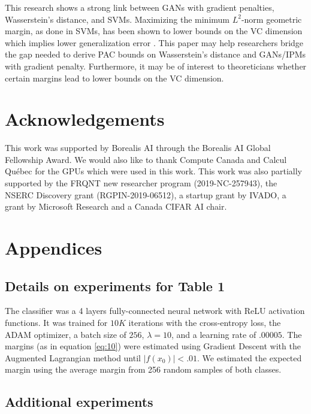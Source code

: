 \documentclass{article}
\begin{document}
This research shows a strong link between GANs with gradient penalties, Wasserstein's distance, and SVMs. Maximizing the minimum $L^2$-norm geometric margin, as done in SVMs, has been shown to lower bounds on the VC dimension which implies lower generalization error \citep{vapnik1998statistical,mount2015sure}. This paper may help researchers bridge the gap needed to derive PAC bounds on Wasserstein's distance and GANs/IPMs with gradient penalty. Furthermore, it may be of interest to theoreticians whether certain margins lead to lower bounds on the VC dimension.




\section{Acknowledgements}
This work was supported by Borealis AI through the Borealis AI Global Fellowship Award. We would also like to thank Compute Canada and Calcul Québec for the GPUs which were used in this work.
This work was also partially supported by the FRQNT new researcher program (2019-NC-257943), the NSERC Discovery grant (RGPIN-2019-06512), a startup grant by IVADO, a grant by Microsoft Research and a Canada CIFAR AI chair.




\clearpage

\appendix
\section*{Appendices}
\renewcommand{\thesubsection}{\Alph{subsection}}

\subsection{Details on experiments for Table 1}
\label{sec:111}

The classifier was a 4 layers fully-connected neural network with ReLU activation functions. It was trained for $10K$ iterations with the cross-entropy loss, the ADAM optimizer, a batch size of $256$, $\lambda=10$, and a learning rate of $.00005$. The margins (as in equation \ref{eq:10}) were estimated using Gradient Descent with the Augmented Lagrangian method \citep{hestenes1969multiplier} until $|f(x_0)|<.01$. We estimated the expected margin using the average margin from 256 random samples of both classes.

\subsection{Additional experiments}
\end{document}
